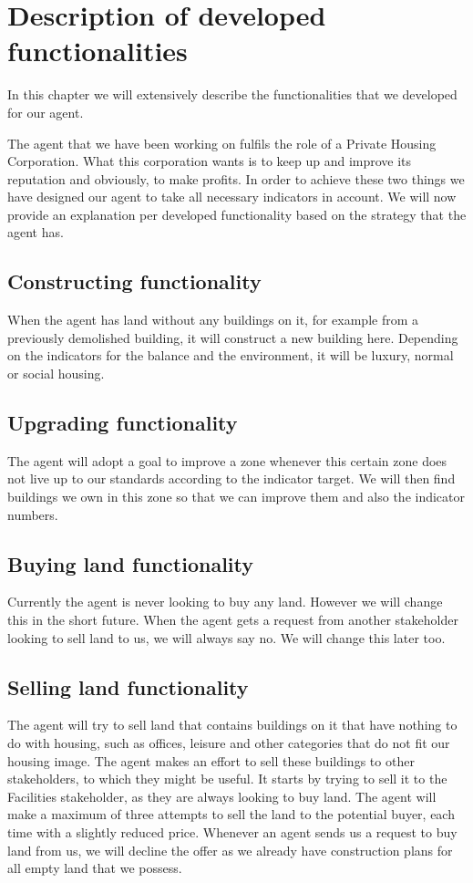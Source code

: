 \chapter{Description of developed functionalities}
In this chapter we will extensively describe the functionalities that we developed for our agent.

The agent that we have been working on fulfils the role of a Private Housing Corporation. What this corporation wants is to keep up and improve its reputation and obviously, to make profits. In order to achieve these two things we have designed our agent to take all necessary indicators in account. We will now provide an explanation per developed functionality based on the strategy that the agent has.

\section{Constructing functionality}
When the agent has land without any buildings on it, for example from a previously demolished building, it will construct a new building here. Depending on the indicators for the balance and the environment, it will be luxury, normal or social housing.

\section{Upgrading functionality}
The agent will adopt a goal to improve a zone whenever this certain zone does not live up to our standards according to the indicator target. We will then find buildings we own in this zone so that we can improve them and also the indicator numbers. 

\section{Buying land functionality}
Currently the agent is never looking to buy any land. However we will change this in the short future. When the agent gets a request from another stakeholder looking to sell land to us, we will always say no. We will change this later too. 

\section{Selling land functionality}
The agent will try to sell land that contains buildings on it that have nothing to do with housing, such as offices, leisure and other categories that do not fit our housing image. The agent makes an effort to sell these buildings to other stakeholders, to which they might be useful. It starts by trying to sell it to the Facilities stakeholder, as they are always looking to buy land. The agent will make a maximum of three attempts to sell the land to the potential buyer, each time with a slightly reduced price.
Whenever an agent sends us a request to buy land from us, we will decline the offer as we already have construction plans for all empty land that we possess.

